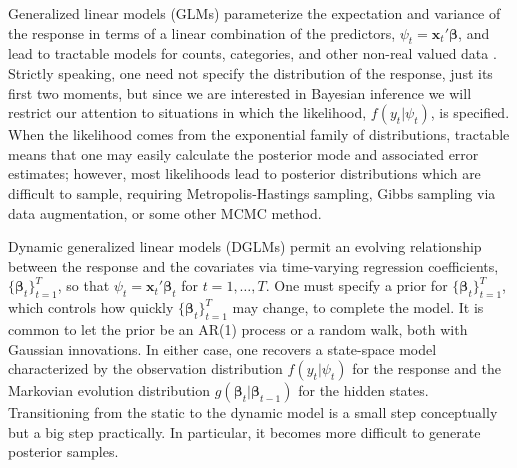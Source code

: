 \documentclass[12pt]{article}
\newcommand{\bbeta}{\boldsymbol{\beta}}
\newcommand{\vx}{\boldsymbol{x}}
\newcounter{parnum}
\newcommand{\npoint}{%
  \noindent\refstepcounter{parnum}%
  \makebox[0.5in][c]{\textbf{\arabic{parnum}.}} %
  \marginnote{\small\ttfamily\the\inputlineno}}
\renewcommand{\npoint}{}
\begin{document}
\npoint Generalized linear models (GLMs) 
parameterize the expectation and variance of the response in terms of a linear
combination of the predictors, $\psi_t = \vx_t' \bbeta$, and lead to tractable
models for counts, categories, and other non-real valued data
\citep{mccullagh-nelder-1989, wedderburn-1974}.  Strictly speaking, one need not
specify the distribution of the response, just its first two moments, but since
we are interested in Bayesian inference we will restrict our attention to
situations in which the likelihood, $f(y_t | \psi_t)$, is specified.  When the
likelihood comes from the exponential family of distributions, tractable means
that one may easily calculate the posterior mode and associated error estimates;
however, most likelihoods lead to posterior distributions which are difficult to
sample, requiring Metropolis-Hastings sampling, Gibbs sampling via data
augmentation, or some other MCMC method.

\npoint Dynamic generalized linear models (DGLMs) permit an evolving
relationship between the response and the covariates via time-varying regression
coefficients, $\{\bbeta_t\}_{t=1}^T$, so that $\psi_t = \vx_t' \bbeta_t$ for
$t=1, \ldots, T$.  One must specify a prior for $\{\bbeta_t\}_{t=1}^T$, which
controls how quickly $\{\bbeta_t\}_{t=1}^T$ may change, to complete the model.
It is common to let the prior be an AR(1) process or a random walk, both with
Gaussian innovations.  In either case, one recovers a state-space model
characterized by the observation distribution $f(y_t | \psi_t)$ for the response
and the Markovian evolution distribution $g(\bbeta_t | \bbeta_{t-1})$ for the
hidden states.  Transitioning from the static to the dynamic model is a small
step conceptually but a big step practically.  In particular, it becomes more
difficult to generate posterior samples.
\end{document}
